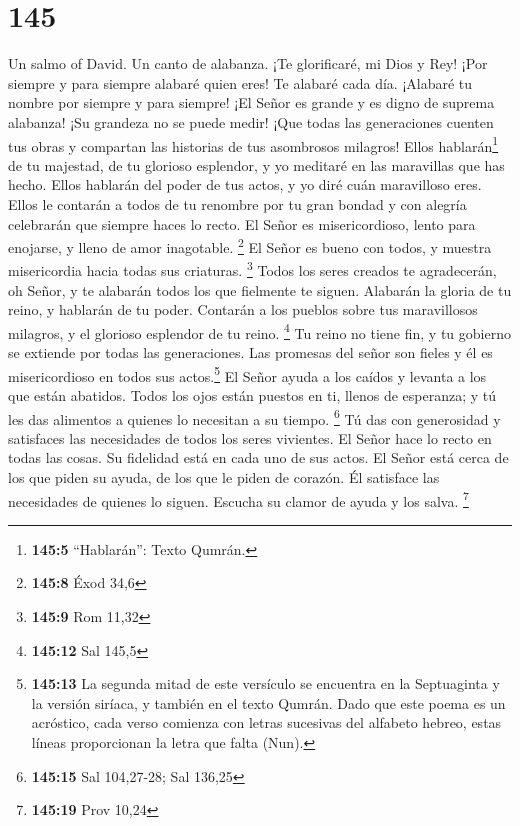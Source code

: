 \hypertarget{section-144}{%
\section{145}\label{section-144}}

Un salmo of David. Un canto de alabanza.  ¡Te glorificaré,
mi Dios y Rey! ¡Por siempre y para siempre alabaré quien eres!
 Te alabaré cada día. ¡Alabaré tu nombre por siempre y
para siempre!  ¡El Señor es grande y es digno de suprema
alabanza! ¡Su grandeza no se puede medir!  ¡Que todas las
generaciones cuenten tus obras y compartan las historias de tus
asombrosos milagros!  Ellos hablarán\footnote{\textbf{145:5}
  ``Hablarán'': Texto Qumrán.} de tu majestad, de tu glorioso esplendor,
y yo meditaré en las maravillas que has hecho.  Ellos
hablarán del poder de tus actos, y yo diré cuán maravilloso eres.
 Ellos le contarán a todos de tu renombre por tu gran
bondad y con alegría celebrarán que siempre haces lo recto.
 El Señor es misericordioso, lento para enojarse, y lleno
de amor inagotable. \footnote{\textbf{145:8} Éxod 34,6} 
El Señor es bueno con todos, y muestra misericordia hacia todas sus
criaturas. \footnote{\textbf{145:9} Rom 11,32}  Todos los
seres creados te agradecerán, oh Señor, y te alabarán todos los que
fielmente te siguen.  Alabarán la gloria de tu reino, y
hablarán de tu poder.  Contarán a los pueblos sobre tus
maravillosos milagros, y el glorioso esplendor de tu reino. \footnote{\textbf{145:12}
  Sal 145,5}  Tu reino no tiene fin, y tu gobierno se
extiende por todas las generaciones. Las promesas del señor son fieles y
él es misericordioso en todos sus actos.\footnote{\textbf{145:13} La
  segunda mitad de este versículo se encuentra en la Septuaginta y la
  versión siríaca, y también en el texto Qumrán. Dado que este poema es
  un acróstico, cada verso comienza con letras sucesivas del alfabeto
  hebreo, estas líneas proporcionan la letra que falta (Nun).}
 El Señor ayuda a los caídos y levanta a los que están
abatidos.  Todos los ojos están puestos en ti, llenos de
esperanza; y tú les das alimentos a quienes lo necesitan a su tiempo.
\footnote{\textbf{145:15} Sal 104,27-28; Sal 136,25}  Tú
das con generosidad y satisfaces las necesidades de todos los seres
vivientes.  El Señor hace lo recto en todas las cosas. Su
fidelidad está en cada uno de sus actos.  El Señor está
cerca de los que piden su ayuda, de los que le piden de corazón.
 Él satisface las necesidades de quienes lo siguen.
Escucha su clamor de ayuda y los salva. \footnote{\textbf{145:19} Prov
  10,24}


